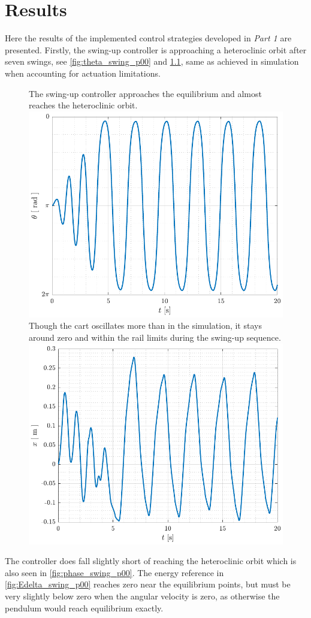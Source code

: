 \chapter{Results}
Here the results of the implemented control strategies developed in \textit{Part 1} are presented. Firstly, the swing-up controller is approaching a heteroclinic orbit after seven swings, see \autoref{fig:theta_swing_p00} and \ref{fig:x_swing_p00}, same as achieved in simulation when accounting for actuation limitations.
%
%
\begin{figure}[H]
  \hspace{1cm}
  \captionbox
  {
    The swing-up controller approaches the equilibrium and almost reaches the heteroclinic orbit.
    \label{fig:theta_swing_p00}
  }
  {
    \hspace{-1cm}
    \includegraphics[width=.39\textwidth]{figures/theta_swing_p00}
  }
  \hspace{20pt}
  \captionbox 
  {
    Though the cart oscillates more than in the simulation, it stays around zero and within the rail limits during the swing-up sequence.
    \label{fig:x_swing_p00}
  }
  {
    \hspace{-1cm}
    \includegraphics[width=.4\textwidth]{figures/x_swing_p00}
  }  
\end{figure}
%
The controller does fall slightly short of reaching the heteroclinic orbit which is also seen in \autoref{fig:phase_swing_p00}. The energy reference in \autoref{fig:Edelta_swing_p00} reaches zero near the equilibrium points, but must be very slightly below zero when the angular velocity is zero, as otherwise the pendulum would reach equilibrium exactly.
